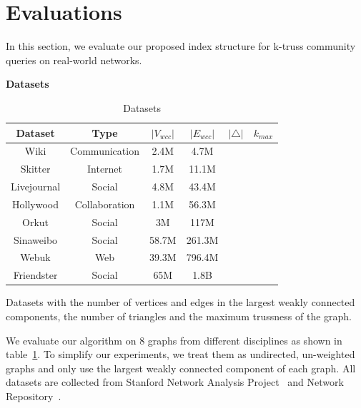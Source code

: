 \section{Evaluations}
\label{evaluation}

In this section, we evaluate our proposed index structure for k-truss community queries on real-world networks.

\vskip 0.1in \noindent \textbf{Datasets} 

\begin{table}
		\caption{Datasets}
		\vspace{2 mm}
		\label{table:datasets}
		\begin{threeparttable}
			\centering
			\begin{tabular}{c|ccccc} \hline
				Dataset & Type & $|V_{wcc}|$ & $|E_{wcc}|$ & $|\triangle|$ & $k_{max}$ \\ \hline
				Wiki & Communication & 2.4M & 4.7M &  & \\ 
				Skitter & Internet & 1.7M & 11.1M & & \\ 
				Livejournal & Social & 4.8M & 43.4M & & \\ 
				Hollywood & Collaboration & 1.1M & 56.3M & & \\ 
				Orkut & Social & 3M & 117M & & \\ 
				Sinaweibo & Social & 58.7M & 261.3M & & \\ 
				Webuk & Web & 39.3M & 796.4M & & \\ 
				Friendster & Social & 65M & 1.8B & & \\ \hline
			\end{tabular}
			\begin{tablenotes}
				\item Datasets with the number of vertices and edges in the largest weakly connected components, the number of triangles and the maximum trussness of the graph.
			\end{tablenotes}
		\end{threeparttable}
\end{table}

We evaluate our algorithm on 8 graphs from different disciplines as shown in table~\ref{table:datasets}. To simplify our experiments, we treat them as undirected, un-weighted graphs and only use the largest weakly connected component of each graph. All datasets are collected from Stanford Network Analysis Project~\cite{snapnets} and Network Repository~\cite{nr-aaai15}.

